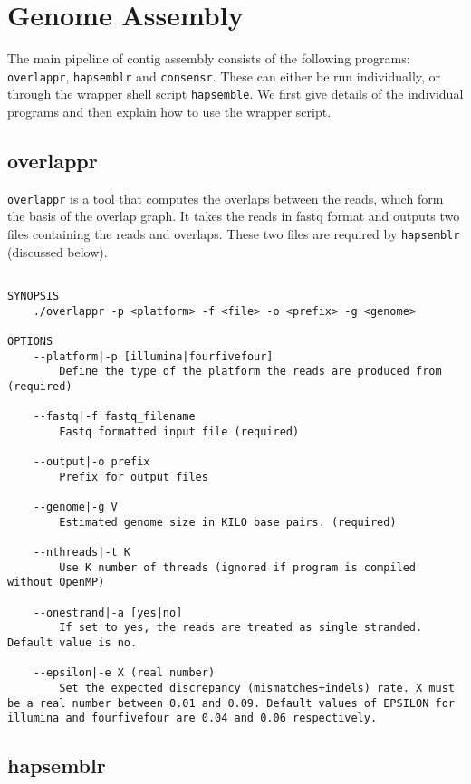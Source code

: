\documentclass[12pt,a4paper]{report}
\begin{document}
\section{Genome Assembly}
\label{assem}

The main pipeline of contig assembly consists of the following programs: \texttt{overlappr}, \texttt{hapsemblr} and \texttt{consensr}. These can either be run individually, or through the wrapper shell script \texttt{hapsemble}. We first give details of the individual programs and then explain how to use the wrapper script.

\subsection{overlappr}

\texttt{overlappr} is a tool that computes the overlaps between the reads, which form the basis of the overlap graph. It takes the reads in fastq format and outputs two files containing the reads and overlaps. These two files are required by \texttt{hapsemblr} (discussed below).

\begin{lstlisting}

SYNOPSIS
    ./overlappr -p <platform> -f <file> -o <prefix> -g <genome>

OPTIONS 
    --platform|-p [illumina|fourfivefour] 
        Define the type of the platform the reads are produced from (required) 

    --fastq|-f fastq_filename 
        Fastq formatted input file (required) 

    --output|-o prefix 
        Prefix for output files 

    --genome|-g V 
        Estimated genome size in KILO base pairs. (required) 

    --nthreads|-t K 
        Use K number of threads (ignored if program is compiled without OpenMP)

    --onestrand|-a [yes|no] 
        If set to yes, the reads are treated as single stranded. Default value is no. 

    --epsilon|-e X (real number) 
        Set the expected discrepancy (mismatches+indels) rate. X must be a real number between 0.01 and 0.09. Default values of EPSILON for illumina and fourfivefour are 0.04 and 0.06 respectively. 

\end{lstlisting}

\subsection{hapsemblr}
\end{document}
